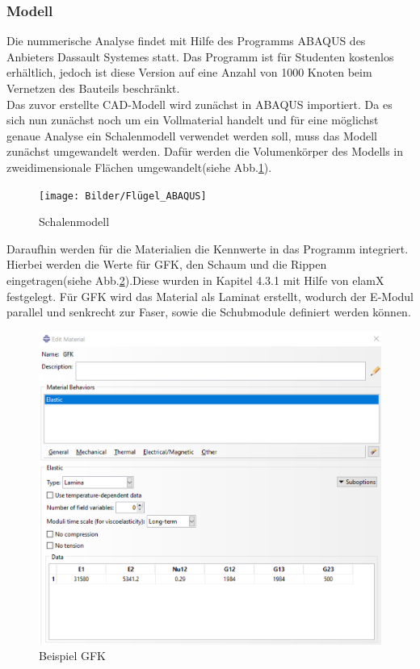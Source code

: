 
\subsubsection{Modell}
Die nummerische Analyse findet mit Hilfe des Programms ABAQUS des Anbieters Dassault Systemes statt. Das Programm ist für Studenten kostenlos erhältlich, jedoch ist diese Version auf eine Anzahl von 1000 Knoten beim Vernetzen des Bauteils beschränkt.\\
Das zuvor erstellte CAD-Modell wird zunächst in ABAQUS importiert. Da es sich nun zunächst noch um ein Vollmaterial handelt und für eine möglichst genaue Analyse ein Schalenmodell verwendet werden soll, muss das Modell zunächst umgewandelt werden. Dafür werden die Volumenkörper des Modells in zweidimensionale Flächen umgewandelt(siehe Abb.\ref{Schalenmodell}).

\begin{figure}[h]
 \centering
 \texttt{[image: Bilder/Flügel\_ABAQUS]}
 \caption{Schalenmodell}
 \label{Schalenmodell}
\end{figure}
\newpage

Daraufhin werden für die Materialien die Kennwerte in das Programm integriert. Hierbei werden die Werte für GFK, den Schaum und die Rippen eingetragen(siehe Abb.\ref{Material}).Diese wurden in Kapitel 4.3.1 mit Hilfe von elamX festgelegt. Für GFK wird das Material als Laminat erstellt, wodurch der E-Modul parallel und senkrecht zur Faser, sowie die Schubmodule definiert werden können.
\begin{figure}[h]
 \centering
 \includegraphics[scale=0.4]{Bilder/Material_GFK}
 \caption{Beispiel GFK}
 \label{Material}
\end{figure}
\newpage

